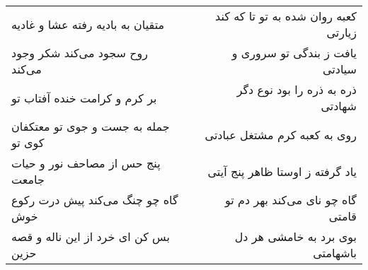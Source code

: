 \begin{center}
\begin{longtable}{l p{0.5cm} r}
متقیان به بادیه رفته عشا و غادیه
&&
کعبه روان شده به تو تا که کند زیارتی
\\
روح سجود می‌کند شکر وجود می‌کند
&&
یافت ز بندگی تو سروری و سیادتی
\\
بر کرم و کرامت خنده آفتاب تو
&&
ذره به ذره را بود نوع دگر شهادتی
\\
جمله به جست و جوی تو معتکفان کوی تو
&&
روی به کعبه کرم مشتغل عبادتی
\\
پنج حس از مصاحف نور و حیات جامعت
&&
یاد گرفته ز اوستا ظاهر پنج آیتی
\\
گاه چو چنگ می‌کند پیش درت رکوع خوش
&&
گاه چو نای می‌کند بهر دم تو قامتی
\\
بس کن ای خرد از این ناله و قصه حزین
&&
بوی برد به خامشی هر دل باشهامتی
\\
\end{longtable}
\end{center}
